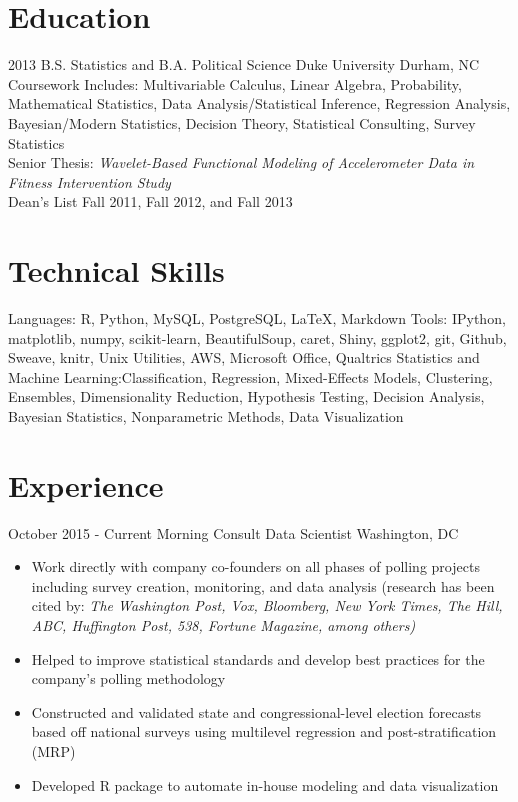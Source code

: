 \documentclass[10pt,a4paper,sans]{moderncv}        %
\begin{document}
\makecvtitle\vspace{-6ex}                          %

\section{Education} 
\cventry
	{2013}
	{B.S. Statistics and B.A. Political Science}
	{Duke University}
	{Durham, NC}
	{}
	{Coursework Includes: Multivariable Calculus, Linear Algebra, Probability, Mathematical Statistics, 
	Data Analysis/Statistical Inference, Regression Analysis, Bayesian/Modern Statistics, Decision Theory,
	Statistical Consulting, Survey Statistics
	\\Senior Thesis: \textit{Wavelet-Based Functional Modeling of Accelerometer Data in Fitness Intervention Study}
	\\Dean's List Fall 2011, Fall 2012, and Fall 2013} 

\section{Technical Skills}
\cvitem
  {Languages:}
  {R, Python, MySQL, PostgreSQL, \LaTeX, Markdown}
\cvitem
  {Tools:}
  {IPython, matplotlib, numpy, scikit-learn, BeautifulSoup, caret, Shiny, ggplot2, git, Github, Sweave, knitr, Unix Utilities, AWS,
  Microsoft Office, Qualtrics}
\cvitem
  {Statistics and Machine Learning:}{Classification, Regression, Mixed-Effects Models, Clustering, Ensembles, Dimensionality Reduction,
  Hypothesis Testing, Decision Analysis, Bayesian Statistics, Nonparametric Methods, Data Visualization}

\section{Experience}
\cventry
  {October 2015 - Current}
  {Morning Consult Data Scientist}
  {}
  {Washington, DC}
  {}
  {
    \begin{itemize}
      \item{Work directly with company co-founders on all phases of polling projects including survey creation, monitoring, and data analysis
      (research has been cited by: \textit{The Washington Post, Vox, Bloomberg, New York Times, The Hill, ABC, Huffington Post, 538,
      Fortune Magazine, among others)}}
      \item{Helped to improve statistical standards and develop best practices for the company’s polling methodology}
      \item{Constructed and validated state and congressional-level election forecasts based off national surveys using multilevel regression 
      and post-stratification (MRP)}
      \item{Developed R package to automate in-house modeling and data visualization}
    \end{itemize}
  }
  
\end{document}
